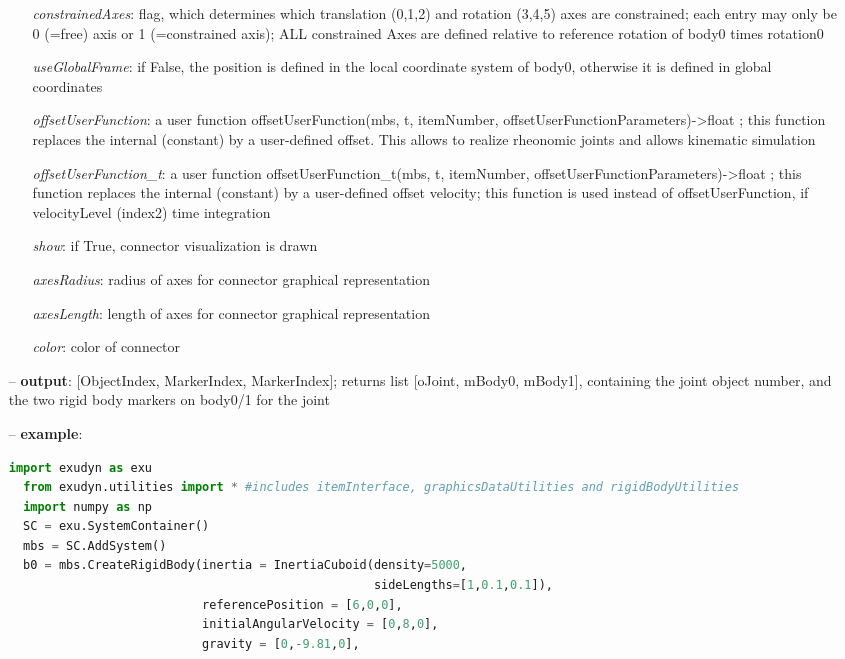 \begin{itemize}[leftmargin=0.7cm]
\begin{itemize}[leftmargin=1.2cm]
\item[]{\it constrainedAxes}: flag, which determines which translation (0,1,2) and rotation (3,4,5) axes are constrained; each entry may only be 0 (=free) axis or 1 (=constrained axis); ALL constrained Axes are defined relative to reference rotation of body0 times rotation0
\item[]{\it useGlobalFrame}: if False, the position is defined in the local coordinate system of body0, otherwise it is defined in global coordinates
\item[]{\it offsetUserFunction}: a user function offsetUserFunction(mbs, t, itemNumber, offsetUserFunctionParameters)->float ; this function replaces the internal (constant) by a user-defined offset. This allows to realize rheonomic joints and allows kinematic simulation
\item[]{\it offsetUserFunction\_t}: a user function offsetUserFunction\_t(mbs, t, itemNumber, offsetUserFunctionParameters)->float ; this function replaces the internal (constant) by a user-defined offset velocity; this function is used instead of offsetUserFunction, if velocityLevel (index2) time integration
\item[]{\it show}: if True, connector visualization is drawn
\item[]{\it axesRadius}: radius of axes for connector graphical representation
\item[]{\it axesLength}: length of axes for connector graphical representation
\item[]{\it color}: color of connector
\end{itemize}
\item[--]
{\bf output}: [ObjectIndex, MarkerIndex, MarkerIndex]; returns list [oJoint, mBody0, mBody1], containing the joint object number, and the two rigid body markers on body0/1 for the joint
\item[--]
{\bf example}: \vspace{-12pt}\ei\begin{lstlisting}[language=Python, xleftmargin=36pt]
  import exudyn as exu
  from exudyn.utilities import * #includes itemInterface, graphicsDataUtilities and rigidBodyUtilities
  import numpy as np
  SC = exu.SystemContainer()
  mbs = SC.AddSystem()
  b0 = mbs.CreateRigidBody(inertia = InertiaCuboid(density=5000,
                                                   sideLengths=[1,0.1,0.1]),
                           referencePosition = [6,0,0],
                           initialAngularVelocity = [0,8,0],
                           gravity = [0,-9.81,0],

\end{lstlisting}
\end{itemize}
